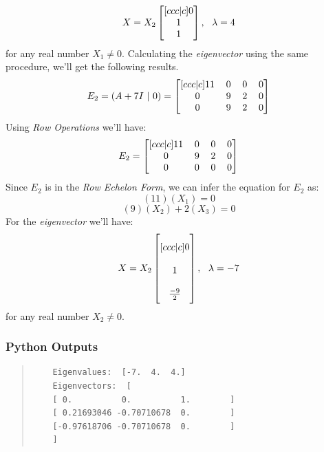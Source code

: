 \documentclass[12pt]{article}
\numberwithin{equation}{section}
\numberwithin{table}{section}
\numberwithin{figure}{section}
\begin{document}
$$
	X =  X_2 \renewcommand\arraystretch{1}
	\setlength\arraycolsep{6pt}
	\begin{bmatrix}[ccc|c]
	0\\	
	1\\
	1\\
	\end{bmatrix} , \ \ \lambda = 4
$$
for any real number $X_1\neq0$. Calculating the \textit{eigenvector} using the same procedure, we'll get the following results.
\begin{equation}\label{eq:2.7}	
E_2 = (A + 7I \ | \ 0) = 
\renewcommand\arraystretch{1}
\setlength\arraycolsep{6pt}
\begin{bmatrix}[ccc|c]
11 & 0 & 0 & 0\\	
0 & 9 & 2 & 0\\
0 & 9 & 2 & 0\\
\end{bmatrix}
\end{equation}
Using \textit{Row Operations} we'll have:
$$
E_2 = 
\renewcommand\arraystretch{1}
\setlength\arraycolsep{6pt}
\begin{bmatrix}[ccc|c]
11 & 0 & 0 & 0\\	
0 & 9 & 2 & 0\\
0 & 0 & 0 & 0\\
\end{bmatrix}
$$
Since $E_2$ is in the \textit{Row Echelon Form}, we can infer the equation for $E_2$ as:
$$
(11)(X_1) = 0
$$
$$
(9)(X_2) + 2(X_3) = 0
$$
For the \textit{eigenvector} we'll have:
$$
	X =  X_2 \renewcommand\arraystretch{2}
	\setlength\arraycolsep{10pt}
	\begin{bmatrix}[ccc|c]
	0\\	
	1\\
	\frac{-9}{2}\\
	\end{bmatrix} , \ \ \lambda = -7
$$
for any real number $X_2\neq0$.
\subsubsection*{Python Outputs}
\begin{quote}
	\begin{verbatim}
	Eigenvalues:  [-7.  4.  4.]
	Eigenvectors:  [
	[ 0.          0.          1.        ]
	[ 0.21693046 -0.70710678  0.        ]
	[-0.97618706 -0.70710678  0.        ]
	]
	\end{verbatim}
\end{quote}
\end{document}

